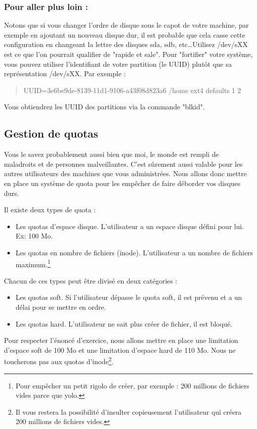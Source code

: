 \documentclass[a4paper,11pt]{article}
\newcommand{\commande}[1] {
    \begin{quote}
    \tt\raggedright #1
    \end{quote}
}
\begin{document}
\subsubsection*{Pour aller plus loin :}
\par Notons que si vous changer l'ordre de disque sous le capot de votre machine, par exemple en ajoutant un nouveau disque dur, il est probable que cela casse cette configuration en changeant la lettre des disques sda, sdb, etc\dots Utilisez /dev/sXX est ce que l'on pourrait qualifier de "rapide et sale". Pour "fortifier" votre système, vous pouvez utiliser l'identifiant de votre partition (le UUID) plutôt que sa représentation /dev/sXX. Par exemple :
\commande{UUID=3e6be9de-8139-11d1-9106-a43f08d823a6 /home ext4 defaults 1 2}
\par Vous obtiendrez les UUID des partitions via la commande "blkid".

\subsection{Gestion de quotas}
\par Vous le savez probablement aussi bien que moi, le monde est rempli de maladroits et de personnes malveillantes. C'est sûrement aussi valable pour les autres utilisateurs des machines que vous administrées. Nous allons donc mettre en place un système de quota pour les empêcher de faire déborder vos disques durs.
\par Il existe deux types de quota :
\begin{itemize}
\item Les quotas d'espace disque. L'utilisateur a un espace disque défini pour lui. Ex: 100 Mo.
\item Les quotas en nombre de fichiers (inode). L'utilisateur a un nombre de fichiers maximum.\footnote{Pour empêcher un petit rigolo de créer, par exemple : 200 millions de fichiers vides parce que yolo.}
\end{itemize}
\par Chacun de ces types peut être divisé en deux catégories :
\begin{itemize}
\item Les quotas soft. Si l'utilisateur dépasse le quota soft, il est prévenu et a un délai pour se mettre en ordre.
\item Les quotas hard. L'utilisateur ne sait plus créer de fichier, il est bloqué.
\end{itemize}
\par Pour respecter l'énoncé d'exercice, nous allons mettre en place une limitation d'espace soft de 100 Mo et une limitation d'espace hard de 110 Mo. Nous ne toucherons pas aux quotas d'inode\footnote{Il vous restera la possibilité d'insulter copieusement l'utilisateur qui créera 200 millions de fichiers vides.}.
\end{document}
